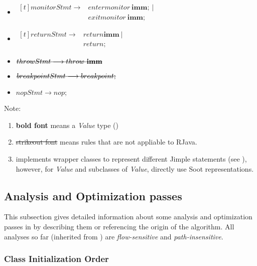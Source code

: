 \documentclass[12pt]{article}
\begin{document}
\begin{itemize}
\item
$\begin{aligned}[t]
monitorStmt \longrightarrow &entermonitor~\mathbf{imm};~|\\
&exitmonitor~\mathbf{imm};
\end{aligned}$

\item
$\begin{aligned}[t]
returnStmt \longrightarrow &return \mathbf{imm}~|\\
&return;
\end{aligned}$

\item
$\msout{throwStmt \longrightarrow throw~\mathbf{imm}}$

\item
$\msout{breakpointStmt \longrightarrow breakpoint;}$

\item
$nopStmt \longrightarrow nop;$
\end{itemize}

\noindent
Note: 
\begin{enumerate}
\item \textbf{bold font} means a \emph{Value} type ()
\item \sout{strikeout font} means rules that are not appliable to RJava. 
\item \rjc implements wrapper classes to represent different Jimple statements
(see ), 
however, for \emph{Value} and subclasses of \emph{Value}, \rjc
directly use Soot representations. 
\end{enumerate}

\subsection{Analysis and Optimization passes}

This subsection gives detailed information about some analysis and optimization passes
in \rjc by describing them or referencing the origin of the algorithm. 
All analyses so far (inherited from )
are \emph{flow-sensitive} and \emph{path-insensitive}. 

\subsubsection{Class Initialization Order}
\end{document}
